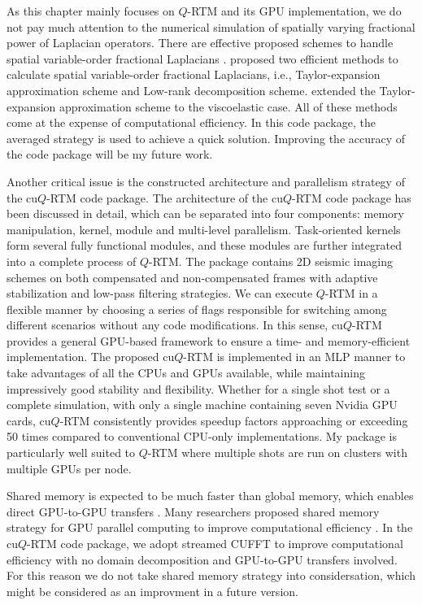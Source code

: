 As this chapter mainly focuses on $Q$-RTM and its GPU implementation, we do not pay much attention to the numerical simulation of spatially varying fractional power of Laplacian operators. There are effective proposed schemes to handle spatial variable-order fractional Laplacians \citep{Sun2014Viscoacoustic, Li2016Efficient, chen2016two, Wangning2018A, wang2018adaptive}. \cite{chen2016two} proposed two efficient methods to calculate spatial variable-order fractional Laplacians, i.e., Taylor-expansion approximation scheme and Low-rank decomposition scheme. \cite{Wangning2018A} extended the Taylor-expansion approximation scheme to the viscoelastic case. All of these methods come at the expense of computational efficiency. In this code package, the averaged strategy \citep{Zhu2014Q} is used to achieve a quick solution. Improving the accuracy of the code package will be my future work.

Another critical issue is the constructed architecture and parallelism strategy of the cu$Q$-RTM code package. The architecture of the cu$Q$-RTM code package has been discussed in detail, which can be separated into four components: memory manipulation, kernel, module and multi-level parallelism. Task-oriented kernels form several fully functional modules, and these modules are further integrated into a complete process of $Q$-RTM. The package contains 2D seismic imaging schemes on both compensated and non-compensated frames with adaptive stabilization and low-pass filtering strategies. We can execute $Q$-RTM in a flexible manner by choosing a series of flags responsible for switching among different scenarios without any code modifications. In this sense, cu$Q$-RTM provides a general GPU-based framework to ensure a time- and memory-efficient implementation. The proposed cu$Q$-RTM is implemented in an MLP manner to take advantages of all the CPUs and GPUs available, while maintaining impressively good stability and flexibility. Whether for a single shot test or a complete simulation, with only a single machine containing seven Nvidia GPU cards, cu$Q$-RTM consistently provides speedup factors approaching or exceeding 50 times compared to conventional CPU-only implementations. My package is particularly well suited to $Q$-RTM where multiple shots are run on clusters with multiple GPUs per node.

Shared memory is expected to be much faster than global memory, which enables direct GPU-to-GPU transfers \citep{nandapalan2012implementation, jaros2012use}. Many researchers proposed shared memory strategy for GPU parallel computing to improve computational efficiency \citep{micikevicius20093d, liu2012fourier, jaros2012use, nandapalan2012implementation, Liu20133D}. In the cu$Q$-RTM code package, we adopt streamed CUFFT to improve computational efficiency with no domain decomposition and GPU-to-GPU transfers involved. For this reason we do not take shared memory strategy into considersation, which might be considered as an improvment in a future version.

